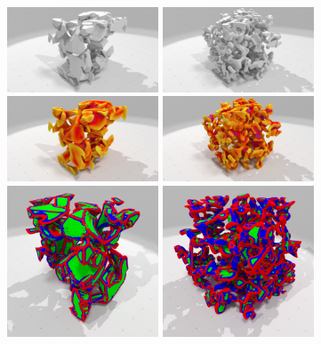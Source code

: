 \begin{figure}[ht]{
    \begin{center}
    \includegraphics[trim={17cm 0 13cm 0},clip,width=4.5cm]{images/digitalSnow/SnowE2_DigitalData}
    \includegraphics[trim={17cm 0 13cm 0},clip,width=4.5cm]{images/digitalSnow/SnowI08_DigitalData}\\
    \includegraphics[trim={17cm 0 13cm 0},clip,width=4.5cm]{images/digitalSnow/snowE2mean_0001}
    \includegraphics[trim={17cm 0 13cm 0},clip,width=4.5cm]{images/digitalSnow/snowI08mean_0001}\\
    \includegraphics[width=4.5cm]{images/digitalSnow/Snow_E2bis_II_scale}
    \includegraphics[width=4.5cm]{images/digitalSnow/Snow_I08_II_scale}\\

\end{center}}
\end{figure}

